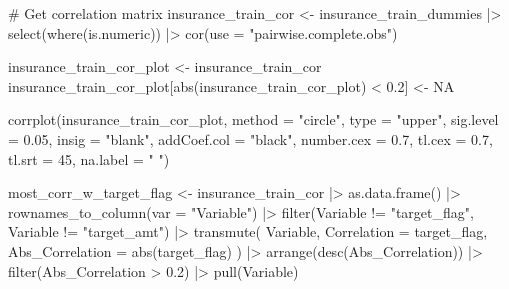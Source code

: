 \documentclass[
  11pt]{article}
\newenvironment{Shaded}{\begin{snugshade}}{\end{snugshade}}
\newcommand{\AttributeTok}[1]{\textcolor[rgb]{0.40,0.45,0.13}{#1}}
\newcommand{\CommentTok}[1]{\textcolor[rgb]{0.37,0.37,0.37}{#1}}
\newcommand{\ConstantTok}[1]{\textcolor[rgb]{0.56,0.35,0.01}{#1}}
\newcommand{\DecValTok}[1]{\textcolor[rgb]{0.68,0.00,0.00}{#1}}
\newcommand{\FloatTok}[1]{\textcolor[rgb]{0.68,0.00,0.00}{#1}}
\newcommand{\FunctionTok}[1]{\textcolor[rgb]{0.28,0.35,0.67}{#1}}
\newcommand{\NormalTok}[1]{\textcolor[rgb]{0.00,0.23,0.31}{#1}}
\newcommand{\OtherTok}[1]{\textcolor[rgb]{0.00,0.23,0.31}{#1}}
\newcommand{\SpecialCharTok}[1]{\textcolor[rgb]{0.37,0.37,0.37}{#1}}
\newcommand{\StringTok}[1]{\textcolor[rgb]{0.13,0.47,0.30}{#1}}
\begin{document}
\begin{Shaded}
\begin{Highlighting}[]
\CommentTok{\# Get correlation matrix}
\NormalTok{insurance\_train\_cor }\OtherTok{\textless{}{-}}\NormalTok{ insurance\_train\_dummies }\SpecialCharTok{|\textgreater{}}
    \FunctionTok{select}\NormalTok{(}\FunctionTok{where}\NormalTok{(is.numeric)) }\SpecialCharTok{|\textgreater{}} 
    \FunctionTok{cor}\NormalTok{(}\AttributeTok{use =} \StringTok{"pairwise.complete.obs"}\NormalTok{)}

\NormalTok{insurance\_train\_cor\_plot }\OtherTok{\textless{}{-}}\NormalTok{ insurance\_train\_cor}
\NormalTok{insurance\_train\_cor\_plot[}\FunctionTok{abs}\NormalTok{(insurance\_train\_cor\_plot) }\SpecialCharTok{\textless{}} \FloatTok{0.2}\NormalTok{] }\OtherTok{\textless{}{-}} \ConstantTok{NA}

\FunctionTok{corrplot}\NormalTok{(insurance\_train\_cor\_plot, }\AttributeTok{method =} \StringTok{"circle"}\NormalTok{, }\AttributeTok{type =} \StringTok{"upper"}\NormalTok{, }\AttributeTok{sig.level =} \FloatTok{0.05}\NormalTok{, }\AttributeTok{insig =} \StringTok{"blank"}\NormalTok{, }\AttributeTok{addCoef.col =} \StringTok{"black"}\NormalTok{, }\AttributeTok{number.cex =} \FloatTok{0.7}\NormalTok{, }\AttributeTok{tl.cex =} \FloatTok{0.7}\NormalTok{, }\AttributeTok{tl.srt =} \DecValTok{45}\NormalTok{, }\AttributeTok{na.label =} \StringTok{" "}\NormalTok{)}

\NormalTok{most\_corr\_w\_target\_flag }\OtherTok{\textless{}{-}}\NormalTok{ insurance\_train\_cor }\SpecialCharTok{|\textgreater{}}
    \FunctionTok{as.data.frame}\NormalTok{() }\SpecialCharTok{|\textgreater{}}
    \FunctionTok{rownames\_to\_column}\NormalTok{(}\AttributeTok{var =} \StringTok{"Variable"}\NormalTok{) }\SpecialCharTok{|\textgreater{}}
    \FunctionTok{filter}\NormalTok{(Variable }\SpecialCharTok{!=} \StringTok{"target\_flag"}\NormalTok{, Variable }\SpecialCharTok{!=} \StringTok{"target\_amt"}\NormalTok{) }\SpecialCharTok{|\textgreater{}}
    \FunctionTok{transmute}\NormalTok{(}
\NormalTok{        Variable,}
        \AttributeTok{Correlation =}\NormalTok{ target\_flag,}
        \AttributeTok{Abs\_Correlation =} \FunctionTok{abs}\NormalTok{(target\_flag)}
\NormalTok{    ) }\SpecialCharTok{|\textgreater{}}
    \FunctionTok{arrange}\NormalTok{(}\FunctionTok{desc}\NormalTok{(Abs\_Correlation)) }\SpecialCharTok{|\textgreater{}}
    \FunctionTok{filter}\NormalTok{(Abs\_Correlation }\SpecialCharTok{\textgreater{}} \FloatTok{0.2}\NormalTok{) }\SpecialCharTok{|\textgreater{}} \FunctionTok{pull}\NormalTok{(Variable)}


\end{Highlighting}
\end{Shaded}
\end{document}
